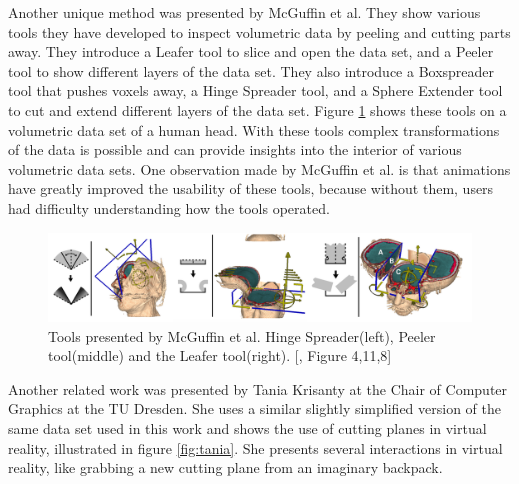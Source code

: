 Another unique method was presented by McGuffin et al.
They show various tools they have developed to inspect volumetric data by peeling and cutting parts away.
They introduce a Leafer tool to slice and open the data set, and a Peeler tool to show different layers of the data set. They also introduce a Boxspreader tool that pushes voxels away, a Hinge Spreader tool, and a Sphere Extender tool to cut and extend different layers of the data set. Figure \ref{fig:McGuffin} shows these tools on a volumetric data set of a human head. 
With these tools complex transformations of the data is possible and can provide insights into the interior of various volumetric data sets.
One observation made by McGuffin et al. is that animations have greatly improved the usability of these tools, because without them, users had difficulty understanding how the tools operated.\cite{McGuffin}
\begin{figure}[h]
	\centering
	\includegraphics[width=1\linewidth]{fig/Images/McGuffin_fig_4_fig11_fig8}
	\caption[]{Tools presented by McGuffin et al. Hinge Spreader(left), Peeler tool(middle) and the Leafer tool(right). [\cite{McGuffin}, Figure 4,11,8]}
	\label{fig:McGuffin}
\end{figure}

Another related work was presented by Tania Krisanty at the Chair of Computer Graphics at the TU Dresden. She uses a similar slightly simplified version of the same data set used in this work and shows the use of cutting planes in virtual reality, illustrated in figure \ref{fig:tania}.
She presents several interactions in virtual reality, like grabbing a new cutting plane from an imaginary backpack.\cite{krisanty_2022}

